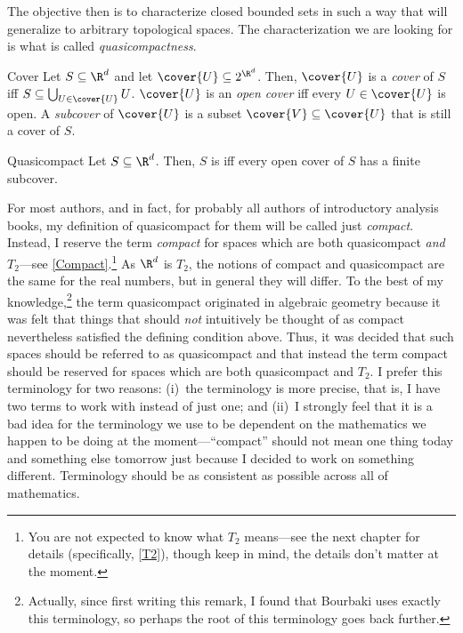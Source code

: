 The objective then is to characterize closed bounded sets in such a way that will generalize to arbitrary topological spaces.  The  characterization we are looking for is what is called \emph{quasicompactness}.
\begin{dfn}{Cover}{}
Let $S\subseteq \R ^d$ and let $\cover{U}\subseteq 2^{\R ^d}$.  Then, $\cover{U}$ is a \emph{cover} of $S$ iff $S\subseteq \bigcup _{U\in \cover{U}}U$.  $\cover{U}$ is an \emph{open cover} iff every $U\in \cover{U}$ is open.  A \emph{subcover} of $\cover{U}$ is a subset $\cover{V}\subseteq \cover{U}$ that is still a cover of $S$.
\end{dfn}
\begin{dfn}{Quasicompact}{}
Let $S\subseteq \R ^d$.  Then, $S$ is  iff every open cover of $S$ has a finite subcover.
\begin{rmk}
For most authors, and in fact, for probably all authors of introductory analysis books, my definition of quasicompact for them will be called just \emph{compact}.  Instead, I reserve the term \emph{compact} for spaces which are both quasicompact \emph{and} $T_2$---see \cref{Compact}.\footnote{You are not expected to know what $T_2$ means---see the next chapter for details (specifically, \cref{T2}), though keep in mind, the details don't matter at the moment.}  As $\R ^d$ is $T_2$, the notions of compact and quasicompact are the same for the real numbers, but in general they will differ.  To the best of my knowledge,\footnote{Actually, since first writing this remark, I found that Bourbaki \cite[pg.~83]{Bourbaki} uses exactly this terminology, so perhaps the root of this terminology goes back further.} the term quasicompact originated in algebraic geometry because it was felt that things that should \emph{not} intuitively be thought of as compact nevertheless satisfied the defining condition above.  Thus, it was decided that such spaces should be referred to as quasicompact and that instead the term compact should be reserved for spaces which are both quasicompact and $T_2$.  I prefer this terminology for two reasons:  (i)~the terminology is more precise, that is, I have two terms to work with instead of just one; and (ii)~I strongly feel that it is a bad idea for the terminology we use to be dependent on the mathematics we happen to be doing at the moment---``compact'' should not mean one thing today and something else tomorrow just because I decided to work on something different.  Terminology should be as consistent as possible across all of mathematics.
\end{rmk}
\end{dfn}

